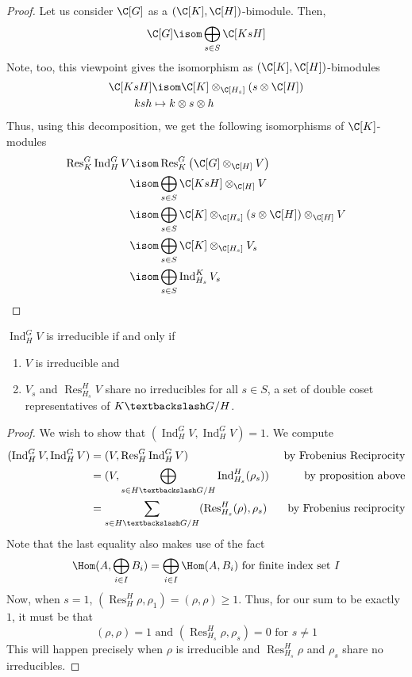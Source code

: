 \documentclass[11pt,leqno,oneside]{amsbook}
\newcommand{\Res}{\operatorname{Res}}
\newcommand{\Ind}{\operatorname{Ind}}
\newcommand{\bs}{\textbackslash}
\numberwithin{thm}{section}
\begin{document}
\begin{proof}
  Let us consider \(\C[G]\) as a \((\C[K], \C[H])\)-bimodule. Then, \[
    \C[G] \isom \bigoplus_{s \in S} \C[KsH]
  \]
  Note, too, this viewpoint gives the isomorphism as \((\C[K],\C[H])\)-bimodules
  \begin{align*}
    \C[KsH] & \isom \C[K] \otimes_{\C[H_s]} (s \otimes \C[H]) \\
    ksh & \mapsto k \otimes s \otimes h
  \end{align*}
  Thus, using this decomposition, we get the following isomorphisms of \(\C[K]\)-modules
  \begin{align*}
    \Res_K^G \Ind_H^G V & \isom \Res_K^G \left( \C[G] \otimes_{\C[H]}
                          V \right) \\
                        & \isom \bigoplus_{s \in S} \C[KsH] \otimes_{\C[H]} V \\
    & \isom \bigoplus_{s \in S} \C[K] \otimes_{\C[H_s]} (s
      \otimes \C[H] ) \otimes_{\C[H]} V \\
    & \isom \bigoplus_{s \in S} \C[K] \otimes_{\C[H_s]}
      V_s \\
    & \isom \bigoplus_{s \in S} \Ind_{H_s}^K V_s 
  \end{align*}  
\end{proof}
\begin{thm}
  \(\Ind_H^G V\) is irreducible if and only if
  \begin{enumerate}
  \item \(V\) is irreducible and
  \item \(V_s\) and \(\Res_{H_s}^H V\) share no irreducibles for all \(s \in
    S\), a set of double coset representatives of \(K \bs G / H\).
  \end{enumerate}
\end{thm}
\begin{proof}
  We wish to show that \((\Ind_H^G V, \Ind_H^G V) = 1\).  We compute
  \begin{align*}
    (\Ind_H^G V, \Ind_H^G V)
    & = (V, \Res_H^G \Ind_H^G V)
    & \text{ by Frobenius Reciprocity}\\
    & = (V, \bigoplus_{s \in H \bs G / H} \Ind_{H_s}^H(\rho_s))
    & \text{ by proposition above}\\
    & = \sum_{s \in H \bs G / H} (\Res_{H_s}^H(\rho), \rho_s)
    & \text{ by Frobenius reciprocity}
  \end{align*}
  Note that the last equality also makes use of the fact \[
    \Hom(A,\bigoplus_{i \in I} B_i) =
    \bigoplus_{i \in I} \Hom(A,B_i) \text{ for finite index set } I
  \]
  Now, when \(s = 1\), \((\Res_H^H \rho,\rho_1) = (\rho, \rho) \geq
  1\). Thus, for our sum to be exactly \(1\), it must be that \[
    (\rho, \rho) = 1 \text{ and } (\Res_{H_s}^H \rho, \rho_s) = 0 \text{ for } s \neq 1
  \]
  This will happen precisely when \(\rho\) is irreducible and
  \(\Res_{H_s}^H \rho\) and \(\rho_s\) share no irreducibles.
\end{proof}
\end{document}
